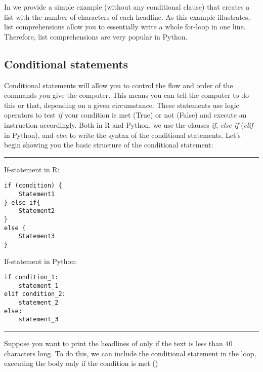 In  we provide a simple example (without any
conditional clause) that creates a list with the number of characters
of each headline. As this example illustrates, list comprehensions
allow you to essentially write a whole for-loop in one
line. Therefore, list comprehensions are very popular in Python.




\subsection{Conditional statements}

Conditional statements will allow you to control the flow and order of
the commands you give the computer. This means you can tell the
computer to do this or that, depending on a given circumstance. These
statements use logic operators to test \emph{if} your condition is met
(True) or not (False) and execute an instruction accordingly. Both in
R and Python, we use the clauses \emph{if}, \emph{else if}
(\emph{elif} in Python), and \emph{else} to write the syntax of the
conditional statements. Let's begin showing you the basic structure of
the conditional statement:

\noindent\rule{\textwidth}{.5pt}\vspace{-1em}

\noindent\begin{minipage}[t]{.45\textwidth}
  If-statement in R:
\begin{verbatim}
if (condition) {
    Statement1
} else if{
    Statement2
}
else {
    Statement3
}
\end{verbatim}
\end{minipage}
\begin{minipage}[t]{.45\textwidth}
  If-statement in Python:
\begin{verbatim}
if condition_1:
    statement_1
elif condition_2:
    statement_2
else:
    statement_3
\end{verbatim}
\end{minipage}
\vspace{.5em}

\noindent\rule{\textwidth}{.5pt}


Suppose you want to print the headlines of  only if the text is less than 40 characters long.
To do this, we can include the conditional statement in the loop, executing the body only if the condition is met ()

